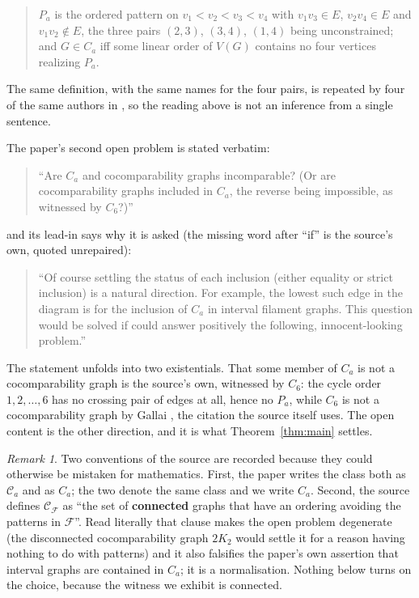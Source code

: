 \documentclass[11pt]{amsart}
\theoremstyle{remark}
\newtheorem*{remark}{Remark}
\newcommand{\Ca}{C_a}
\newcommand{\Pa}{P_a}
\begin{document}
\begin{quote}
$\Pa$ is the ordered pattern on $v_1<v_2<v_3<v_4$ with $v_1v_3\in E$,
$v_2v_4\in E$ and $v_1v_2\notin E$, the three pairs $(2,3)$, $(3,4)$, $(1,4)$
being unconstrained; and $G\in\Ca$ iff some linear order of $V(G)$ contains no
four vertices realizing $\Pa$.
\end{quote}

The same definition, with the same names for the four pairs, is repeated by four of
the same authors in \cite{DFHP}, so the reading above is not an inference from a
single sentence.

The paper's second open problem is stated verbatim:

\begin{quote}
``Are $C_a$ and cocomparability graphs incomparable? (Or are cocomparability
graphs included in $C_a$, the reverse being impossible, as witnessed by $C_6$?)''
\end{quote}

and its lead-in says why it is asked (the missing word after ``if'' is the
source's own, quoted unrepaired):

\begin{quote}
``Of course settling the status of each inclusion (either equality or strict
inclusion) is a natural direction. For example, the lowest such edge in the
diagram is for the inclusion of $C_a$ in interval filament graphs. This question
would be solved if could answer positively the following, innocent-looking
problem.''
\end{quote}

The statement unfolds into two existentials. That some member of $\Ca$ is not a
cocomparability graph is the source's own, witnessed by $C_6$: the cycle order
$1,2,\dots,6$ has no crossing pair of edges at all, hence no $\Pa$, while $C_6$
is not a cocomparability graph by Gallai \cite{Gallai}, the citation the source
itself uses. The open content is the other direction, and it is what
Theorem~\ref{thm:main} settles.

\begin{remark}
Two conventions of the source are recorded because they could otherwise be
mistaken for mathematics. First, the paper writes the class both as
$\mathcal C_a$ and as $C_a$; the two denote the same class and we write $\Ca$.
Second, the source defines $\mathcal C_{\mathcal F}$ as ``the set of
\textbf{connected} graphs that have an ordering avoiding the patterns in
$\mathcal F$''. Read literally that clause makes the open problem degenerate
(the disconnected cocomparability graph $2K_2$ would settle it for a reason having
nothing to do with patterns) and it also falsifies the paper's own assertion that
interval graphs are contained in $\Ca$; it is a normalisation. Nothing below turns
on the choice, because the witness we exhibit is connected.
\end{remark}
\end{document}
